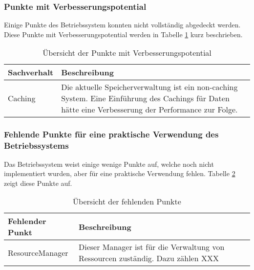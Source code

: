 \subsubsection{Punkte mit Verbesserungspotential}
Einige Punkte des Betriebssystem konnten nicht vollständig abgedeckt werden. Diese Punkte mit Verbesserungspotential werden in Tabelle \ref{table:points-to-improve} kurz beschrieben.

\begin{table}[H]
\begin{tabular}{p{5cm} | p{9cm}}
  \textbf{Sachverhalt} & \textbf{Beschreibung}
  \\ \hline
  Caching & Die aktuelle Speicherverwaltung ist ein non-caching System. Eine Einführung des Cachings für Daten hätte eine Verbesserung der Performance zur Folge. \\
  
 \end{tabular}
 \caption{Übersicht der Punkte mit Verbesserungspotential}
 \label{table:points-to-improve}
\end{table}

\subsubsection{Fehlende Punkte für eine praktische Verwendung des Betriebssystems}
Das Betriebssystem weist einige wenige Punkte auf, welche noch nicht implementiert wurden, aber für eine praktische Verwendung fehlen. Tabelle \ref{table:missing-points} zeigt diese Punkte auf.

\begin{table}[H]
\begin{tabular}{p{5cm} | p{9cm}}
  \textbf{Fehlender Punkt} & \textbf{Beschreibung}
  \\ \hline
  ResourceManager & Dieser Manager ist für die Verwaltung von Ressourcen zuständig. Dazu zählen XXX\\
  
 \end{tabular}
 \caption{Übersicht der fehlenden Punkte}
 \label{table:missing-points}
\end{table}